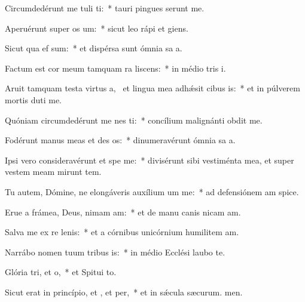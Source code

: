 \item Circumdedérunt me tuli ti:~* tauri pingues serunt me.
\item Aperuérunt super  os um:~* sicut leo rápi et giens.
\item Sicut qua ef sum:~* et dispérsa sunt ómnia sa a.
\item Factum est cor meum tamquam ra liscens:~* in médio tris i.
\item Aruit tamquam testa virtus a,~\pscross{} et lingua mea adhǽsit cibus is:~* et in púlverem mortis duti me.
\item Quóniam circumdedérunt me nes ti:~* concílium malignánti obdit me.
\item Fodérunt manus meas et des os:~* dinumeravérunt ómnia sa a.
\item Ipsi vero consideravérunt et spe me:~* divisérunt sibi vestiménta mea, et super vestem meam mirunt tem.
\item Tu autem, Dómine, ne elongáveris auxílium um  me:~* ad defensiónem am spice.
\item Erue a frámea, Deus, nimam am:~* et de manu canis nicam am.
\item Salva me ex re lenis:~* et a córnibus unicórnium humilitem am.
\item Narrábo nomen tuum tribus is:~* in médio Ecclési laubo te.
\item Glória tri, et o,~* et Spitui to.
\item Sicut erat in princípio, et , et per,~* et in sǽcula sæcurum. men.

